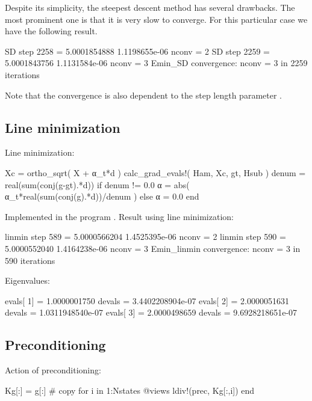 Despite its simplicity, the steepest descent method has several drawbacks.
The most prominent one is that it is very slow to converge. For this particular case
we have the following result.

\begin{fullwidth}
\begin{textcode}
SD step     2258 =       5.0001854888   1.1198655e-06  nconv =     2
SD step     2259 =       5.0001843756   1.1131584e-06  nconv =     3
Emin_SD convergence: nconv =     3 in  2259 iterations
\end{textcode}
\end{fullwidth}

Note that the convergence is also dependent to the step
length parameter .

\subsection{Line minimization}

Line minimization:
\begin{juliacode}
Xc = ortho_sqrt( X + α_t*d )
calc_grad_evals!( Ham, Xc, gt, Hsub )
denum = real(sum(conj(g-gt).*d))
if denum != 0.0
    α = abs( α_t*real(sum(conj(g).*d))/denum )
else
    α = 0.0
end
\end{juliacode}

Implemented in the program .
Result using line minimization:
\begin{fullwidth}
\begin{textcode}
linmin step      589 =       5.0000566204   1.4525395e-06  nconv =     2
linmin step      590 =       5.0000552040   1.4164238e-06  nconv =     3
Emin_linmin convergence: nconv =     3 in   590 iterations
  
Eigenvalues:
  
evals[  1] =       1.0000001750 devals =   3.4402208904e-07
evals[  2] =       2.0000051631 devals =   1.0311948540e-07
evals[  3] =       2.0000498659 devals =   9.6928218651e-07  
\end{textcode}
\end{fullwidth}


\subsection{Preconditioning}

Action of preconditioning:

\begin{juliacode}
Kg[:] = g[:] # copy
for i in 1:Nstates
    @views ldiv!(prec, Kg[:,i])
end
\end{juliacode}

